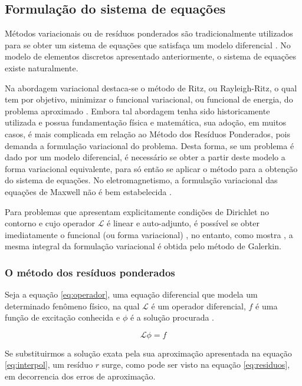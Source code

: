 \documentclass[
    12pt,               %
    openright,          %
    oneside,
    a4paper,            %
    english,            %
    french,             %
    spanish,            %
    brazil              %
    ]{abntex2}
\begin{document}
\subsection{Formulação do sistema de equações}
Métodos variacionais ou de resíduos ponderados são tradicionalmente utilizados para se obter um sistema de equações que satisfaça um modelo diferencial \cite[p. 34]{jin}. No modelo de elementos discretos apresentado anteriormente, o sistema de equações existe naturalmente.

Na abordagem variacional destaca-se o método de Ritz, ou Rayleigh-Ritz, o qual tem por objetivo, minimizar o funcional variacional, ou funcional de energia, do problema aproximado \cite[p. 24]{volakis}. Embora tal abordagem tenha sido historicamente utilizada e possua fundamentação física e matemática, sua adoção, em muitos casos, é mais complicada em relação ao Método dos Resíduos Ponderados, pois demanda a formulação variacional do problema. Desta forma, se um problema é dado por um modelo diferencial, é necessário se obter a partir deste modelo a forma variacional equivalente, para só então se aplicar o método para a obtenção do sistema de equações. No eletromagnetismo, a formulação variacional das equações de Maxwell não é bem estabelecida \cite[p. 211]{jin}.

Para problemas que apresentam explicitamente condições de Dirichlet no contorno e cujo operador $\mathcal{L}$ é linear e auto-adjunto, é possível se obter imediatamente o funcional (ou forma variacional) \cite[p. 81]{zien}, no entanto, como mostra \cite[p. 29]{volakis}, a mesma integral da formulação variacional é obtida pelo método de Galerkin.

\subsubsection{O método dos resíduos ponderados}

Seja a equação \ref{eq:operador}, uma equação diferencial que modela um determinado fenômeno físico, na qual $\mathcal{L}$ é um operador diferencial, $f$ é uma função de excitação conhecida e $\phi$ é a solução procurada \cite[p. 20]{jin}\cite[p. 24]{volakis}.

 \begin{equation}
    \label{eq:operador}
    \mathcal{L} \phi = f
 \end{equation}
 
 Se substituirmos a solução exata pela sua aproximação apresentada na equação \ref{eq:interpol}, um resíduo $r$ surge, como pode ser visto na equação \ref{eq:residuos}, em decorrencia dos erros de aproximação.
 
\end{document}
